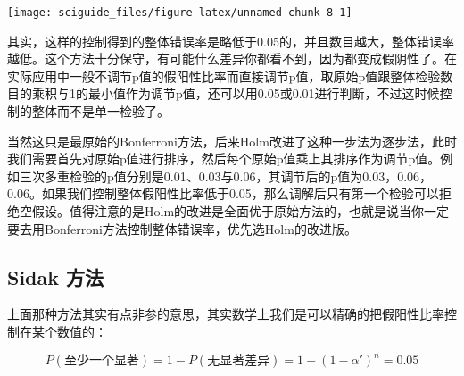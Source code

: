 \documentclass[]{tufte-book}
\newenvironment{Shaded}{}{}
\newcommand{\CommentTok}[1]{\textcolor[rgb]{0.38,0.63,0.69}{\textit{#1}}}
\newcommand{\DataTypeTok}[1]{\textcolor[rgb]{0.56,0.13,0.00}{#1}}
\newcommand{\DecValTok}[1]{\textcolor[rgb]{0.25,0.63,0.44}{#1}}
\newcommand{\FloatTok}[1]{\textcolor[rgb]{0.25,0.63,0.44}{#1}}
\newcommand{\KeywordTok}[1]{\textcolor[rgb]{0.00,0.44,0.13}{\textbf{#1}}}
\newcommand{\NormalTok}[1]{#1}
\newcommand{\OperatorTok}[1]{\textcolor[rgb]{0.40,0.40,0.40}{#1}}
\newcommand{\StringTok}[1]{\textcolor[rgb]{0.25,0.44,0.63}{#1}}
\begin{document}
\begin{Shaded}
\end{Shaded}

\texttt{[image: sciguide\_files/figure-latex/unnamed-chunk-8-1]}

其实，这样的控制得到的整体错误率是略低于0.05的，并且数目越大，整体错误率越低。这个方法十分保守，有可能什么差异你都看不到，因为都变成假阴性了。在实际应用中一般不调节p值的假阳性比率而直接调节p值，取原始p值跟整体检验数目的乘积与1的最小值作为调节p值，还可以用0.05或0.01进行判断，不过这时候控制的整体而不是单一检验了。

当然这只是最原始的Bonferroni方法，后来Holm改进了这种一步法为逐步法，此时我们需要首先对原始p值进行排序，然后每个原始p值乘上其排序作为调节p值。例如三次多重检验的p值分别是0.01、0.03与0.06，其调节后的p值为0.03，0.06，0.06。如果我们控制整体假阳性比率低于0.05，那么调解后只有第一个检验可以拒绝空假设。值得注意的是Holm的改进是全面优于原始方法的，也就是说当你一定要去用Bonferroni方法控制整体错误率，优先选Holm的改进版。

\hypertarget{sidak-ux65b9ux6cd5}{%
\subsection{Sidak 方法}\label{sidak-ux65b9ux6cd5}}

上面那种方法其实有点非参的意思，其实数学上我们是可以精确的把假阳性比率控制在某个数值的：

\[
P(至少一个显著)=1-P(无显著差异) = 1-(1-\alpha')^n = 0.05
\]
\end{document}
